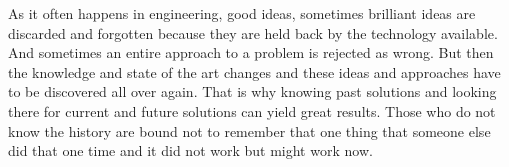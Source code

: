 As it often happens in engineering, good ideas, sometimes brilliant ideas are
discarded and forgotten because they are held back by the technology available.
And sometimes an entire approach to a problem is rejected as wrong. But then
the knowledge and state of the art changes and these ideas and approaches have
to be discovered all over again. That is why knowing past solutions and looking
there for current and future solutions can yield great results. Those who do
not know the history are bound not to remember that one thing that someone else
did that one time and it did not work but might work now.

